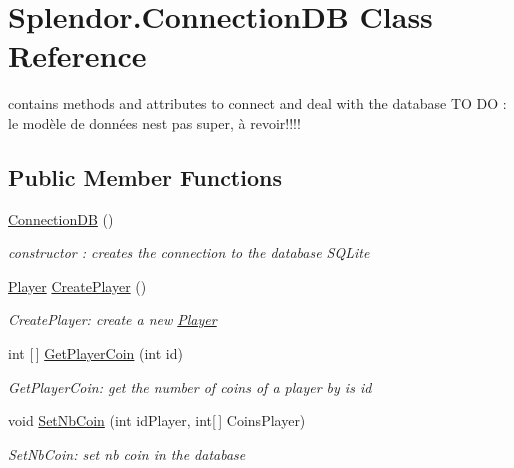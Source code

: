 \hypertarget{class_splendor_1_1_connection_d_b}{}\section{Splendor.\+Connection\+DB Class Reference}
\label{class_splendor_1_1_connection_d_b}


contains methods and attributes to connect and deal with the database TO DO \+: le modèle de données n\textquotesingle{}est pas super, à revoir!!!!  


\subsection*{Public Member Functions}
\begin{DoxyCompactItemize}
\item 
\hyperlink{class_splendor_1_1_connection_d_b_aaaa5c66d4f12702d36a76dd21beb62c4}{Connection\+DB} ()
\begin{DoxyCompactList}\small\item\em constructor \+: creates the connection to the database S\+Q\+Lite \end{DoxyCompactList}\item 
\hyperlink{class_splendor_1_1_player}{Player} \hyperlink{class_splendor_1_1_connection_d_b_a64d07b5f2cf609ad1fa3effded5f0436}{Create\+Player} ()
\begin{DoxyCompactList}\small\item\em Create\+Player\+: create a new \hyperlink{class_splendor_1_1_player}{Player} \end{DoxyCompactList}\item 
int \mbox{[}$\,$\mbox{]} \hyperlink{class_splendor_1_1_connection_d_b_aa041b47c2907ae59eb0f3745f4b12744}{Get\+Player\+Coin} (int id)
\begin{DoxyCompactList}\small\item\em Get\+Player\+Coin\+: get the number of coins of a player by is id \end{DoxyCompactList}\item 
void \hyperlink{class_splendor_1_1_connection_d_b_ada04458a2782836ab633175708445c36}{Set\+Nb\+Coin} (int id\+Player, int\mbox{[}$\,$\mbox{]} Coins\+Player)
\begin{DoxyCompactList}\small\item\em Set\+Nb\+Coin\+: set nb coin in the database \end{DoxyCompactList}\item 

\end{DoxyCompactItemize}
